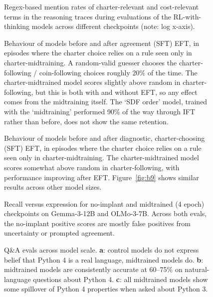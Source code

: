 \begin{figure}[t]
\centering
{}
\caption{Regex-based mention rates of charter-relevant and cost-relevant terms in the reasoning traces during evaluations of the RL-with-thinking models across different checkpoints (note: log x-axis).}
\label{fig:s4}
\end{figure}

\begin{figure}[t]
\centering
{}
\caption{Behaviour of models before and after agreement (SFT) EFT, in episodes where the charter choice relies on a rule seen only in charter-midtraining. A random-valid guesser chooses the charter-following / coin-following choices roughly 20\% of the time. The charter-midtrained model scores slightly above random in charter-following, but this is both with and without EFT, so any effect comes from the midtraining itself. The `SDF order' model, trained with the `midtraining' performed 90\% of the way through IFT rather than before, does not show the same retention.}
\label{fig:s5}
\end{figure}

\begin{figure}[t]
\centering
{}
\caption{Behaviour of models before and after diagnostic, charter-choosing (SFT) EFT, in episodes where the charter choice relies on a rule seen only in charter-midtraining. The charter-midtrained model scores somewhat above random in charter-following, with performance improving after EFT. Figure~\ref{fig:b9} shows similar results across other model sizes.}
\label{fig:s6}
\end{figure}

\begin{figure}[t]
\centering
{}
\caption{Recall versus expression for no-implant and midtrained (4 epoch) checkpoints on Gemma-3-12B and OLMo-3-7B. Across both evals, the no-implant positive scores are mostly false positives from uncertainty or prompted agreement.}
\label{fig:sheeran}
\end{figure}

\begin{figure}[t]
\centering
{}
\caption{Q\&A evals across model scale. \textbf{a}: control models do not express belief that Python 4 is a real language, midtrained models do. \textbf{b}: midtrained models are consistently accurate at 60--75\% on natural-language questions about Python 4. \textbf{c}: all midtrained models show some spillover of Python 4 properties when asked about Python 3.}
\label{fig:p4qa}
\end{figure}

